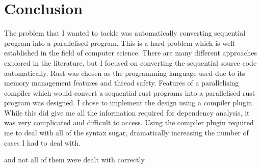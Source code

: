 \chapter{Conclusion}
The problem that I wanted to tackle was automatically converting sequential program into a parallelised program. This is a hard problem which is well established in the field of computer science. There are many different approaches explored in the literature, but I focused on converting the sequential source code automatically. Rust was chosen as the programming language used due to its memory management features and thread safety. Features of a parallelising compiler which would convert a sequential rust programs into a parallelised rust program was designed.  I chose to implement the design using a compiler plugin. While this did give me all the information required for dependency analysis, it was very complicated and difficult to access. Using the compiler plugin required me to deal with all of the syntax sugar, dramatically increasing the number of cases I had to deal with.  


and not all of them were dealt with correctly.

